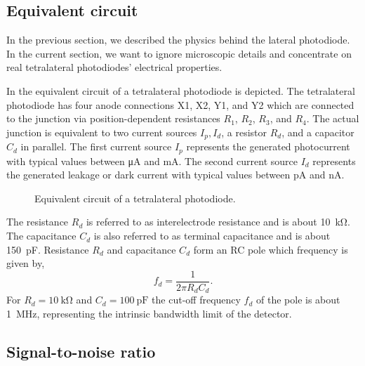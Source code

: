 \subsection{Equivalent circuit}

In the previous section, we described the physics behind the lateral photodiode.
In the current section, we want to ignore microscopic details and concentrate on real tetralateral photodiodes' electrical properties.

In  the equivalent circuit of a tetralateral photodiode is depicted.
The tetralateral photodiode has four anode connections X1, X2, Y1, and Y2 which are connected to the junction via position-dependent resistances $R_1$, $R_2$, $R_3$, and $R_4$.
The actual junction is equivalent to two current sources $I_p,I_d$, a resistor $R_d$, and a capacitor $C_d$ in parallel.
The first current source $I_p$ represents the generated photocurrent with typical values between \si{\micro\ampere} and \si{\milli\ampere}.
The second current source $I_d$ represents the generated leakage or dark current with typical values between \si{\pico\ampere} and \si{\nano\ampere}.
\begin{figure}[H]
	\centering
	
	\caption{Equivalent circuit of a tetralateral photodiode.}\label{fig:tetralateral_photodiode_equivalent}
\end{figure}
The resistance $R_d$ is referred to as interelectrode resistance and is about \SI{10}{\kilo\ohm}.
The capacitance $C_d$ is also referred to as terminal capacitance and is about \SI{150}{\pico\farad}.
Resistance $R_d$ and capacitance $C_d$ form an RC pole which frequency is given by,
\begin{equation}
	f_d=\frac{1}{2\pi R_dC_d}.
\end{equation}
For $R_d=\SI{10}{\kilo\ohm}$ and $C_d=\SI{100}{\pico\farad}$ the cut-off frequency $f_d$ of the pole is about \SI{1}{\mega\hertz}, representing the intrinsic bandwidth limit of the detector.

\subsection{Signal-to-noise ratio}


